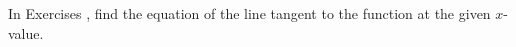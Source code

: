 {\noindent In Exercises}
{, find the equation of the line tangent to the function at the given $x$-value.}

